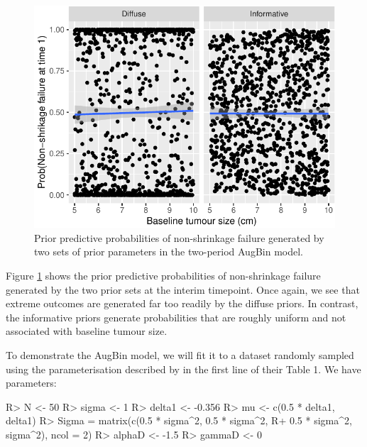 \documentclass[article]{jss}
\begin{document}
\begin{CodeChunk}
\begin{figure}

{\centering \includegraphics{trialr_files/figure-latex/augbin_prior_pred_nsf-1} 

}

\caption[Prior predictive probabilities of non-shrinkage failure generated by two sets of prior parameters in the two-period AugBin model]{Prior predictive probabilities of non-shrinkage failure generated by two sets of prior parameters in the two-period AugBin model.}\label{fig:augbin_prior_pred_nsf}
\end{figure}
\end{CodeChunk}

Figure \ref{fig:augbin_prior_pred_nsf} shows the prior predictive
probabilities of non-shrinkage failure generated by the two prior sets
at the interim timepoint. Once again, we see that extreme outcomes are
generated far too readily by the diffuse priors. In contrast, the
informative priors generate probabilities that are roughly uniform and
not associated with baseline tumour size.

To demonstrate the AugBin model, we will fit it to a dataset randomly
sampled using the parameterisation described by \citet{Wason2013} in the
first line of their Table 1. We have parameters:

\begin{CodeChunk}

\begin{CodeInput}
R> N <- 50
R> sigma <- 1
R> delta1 <- -0.356
R> mu <- c(0.5 * delta1, delta1)
R> Sigma = matrix(c(0.5 * sigma^2, 0.5 * sigma^2, 
R+                  0.5 * sigma^2, sigma^2), ncol = 2)
R> alphaD <- -1.5
R> gammaD <- 0
\end{CodeInput}
\end{CodeChunk}
\end{document}
